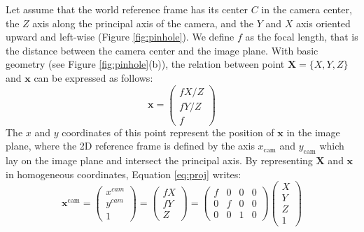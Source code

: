 Let assume that the world reference frame has its center $C$ in the camera center, the $Z$ axis along the principal axis of the camera, and the $Y$ and $X$ axis oriented upward and left-wise (Figure \ref{fig:pinhole}). 
We define $f$ as the focal length, that is the distance between the camera center and the image plane.
With basic geometry (see Figure \ref{fig:pinhole}(b)), the relation between  point $\mathbf{X} = \{X, Y, Z\}$ and $\mathbf{x}$ can be expressed as follows:
\begin{equation}
\label{eq:proj}
 \mathbf{x} = 
 \begin{pmatrix}
 fX/Z\\
 fY/Z\\
 f
 \end{pmatrix}
\end{equation}
The $x$ and $y$ coordinates of this point represent the position of $\mathbf{x}$ in the image plane, where the 2D reference frame is defined by the axis $x_{\text{cam}}$ and $y_{\text{cam}}$ which lay on the image plane and intersect the principal axis.
By representing $\mathbf{X}$ and $\mathbf{x}$ in homogeneous coordinates, Equation \ref{eq:proj} writes:
\begin{equation}
\label{eq:intrSimple}
 \mathbf{x}^{\text{cam}} = 
 \begin{pmatrix}
 x^{cam}\\
 y^{cam}\\
 1
 \end{pmatrix} =
 \begin{pmatrix}
 fX\\
 fY\\
 Z
 \end{pmatrix}=
 \begin{pmatrix}
 f&0&0&0\\
 0&f&0&0\\
 0&0&1&0
 \end{pmatrix} 
 \begin{pmatrix}
 X\\
 Y\\
 Z\\
 1
 \end{pmatrix}
\end{equation}

